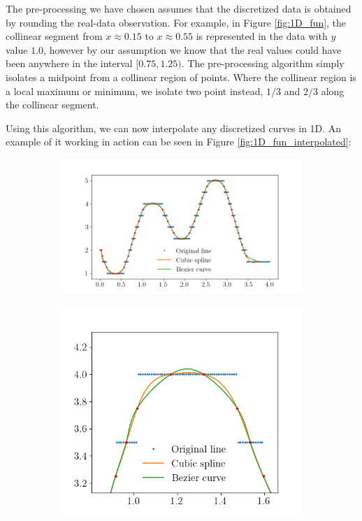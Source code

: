 \documentclass[a4paper,10pt]{report}
\begin{document}
The pre-processing we have chosen assumes that the discretized data is obtained by rounding the real-data observation. For example, in Figure \ref{fig:1D_fun}, the collinear segment from $x\approx0.15$ to $x\approx0.55$ is represented in the data with $y$ value $1.0$, however by our assumption we know that the real values could have been anywhere in the interval $[0.75, 1.25)$. The pre-processing algorithm simply isolates a midpoint from a collinear region of points. Where the collinear region is a local maximum or minimum, we isolate two point instead, $1/3$ and $2/3$ along the collinear segment.

Using this algorithm, we can now interpolate any discretized curves in 1D. An example of it working in action can be seen in Figure \ref{fig:1D_fun_interpolated}:
\begin{figure}[H]
    \centering
    \begin{subfigure}{0.6\textwidth}
        \includegraphics[width=\textwidth]{../images/1D_Function_Interpolated.png}
    \end{subfigure}
    \hfill
    \begin{subfigure}{0.39\textwidth}
        \includegraphics[width=\textwidth]{../images/1D_Function_Interpolated_Zoomed.png}

\end{subfigure}
\end{figure}
\end{document}
